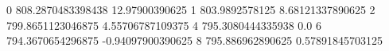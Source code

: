 0 808.2870483398438 12.97900390625
1 803.9892578125 8.68121337890625
2 799.8651123046875 4.55706787109375
4 795.3080444335938 0.0
6 794.3670654296875 -0.94097900390625
8 795.886962890625 0.57891845703125
